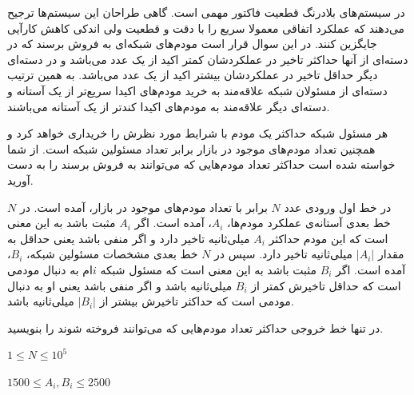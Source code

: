 \documentclass[11.5pt,a4paper,oneside]{article}
\begin{document}
\def\problemCode{Realtime}
\def\problemEnglishTitle{Realtime Network}
\def\problemFarsiTitle{شبکه‌های بلادرنگ}
\def\timeLimit{$1$ \second}
\def\memLimit{$32$ \megabytes}
\begin{problem}
در سیستم‌های بلادرنگ قطعیت فاکتور مهمی است. گاهی طراحان این سیستم‌ها ترجیح می‌دهند که عملکرد اتفاقی معمولا سریع را با دقت و قطعیت ولی اندکی کاهش کارآیی جایگزین کنند. در این سوال قرار است مودم‌های شبکه‌ای به فروش برسند که در دسته‌ای از آنها حداکثر تاخیر در عملکردشان کمتر اکید از یک عدد می‌باشد و در دسته‌ای دیگر حداقل تاخیر در عملکردشان بیشتر اکید از یک عدد می‌باشد. به همین ترتیب دسته‌ای از مسئولان شبکه علاقه‌مند به خرید مودم‌های اکیدا سریع‌تر از یک آستانه و دسته‌ای دیگر علاقه‌مند به مودم‌های اکیدا کند‌تر از یک آستانه می‌باشند.

هر مسئول شبکه حداکثر یک مودم با شرایط مورد نظرش را خریداری خواهد کرد و همچنین تعداد مودم‌های موجود در بازار برابر تعداد مسئولین شبکه است. از شما خواسته شده است حداکثر تعداد مودم‌هایی که می‌توانند به فروش برسند را به‌ دست آورید.

در خط اول ورودی عدد $N$ برابر با تعداد مودم‌های موجود در بازار، آمده است. در $N$ خط بعدی آستانه‌ی عملکرد مودم‌ها، $A_i$، آمده است. اگر $A_i$ مثبت باشد به این معنی است که این مودم حداکثر $A_i$ میلی‌ثانیه تاخیر دارد و اگر منفی باشد یعنی حداقل به مقدار $|A_i|$ میلی‌ثانیه تاخیر دارد.
سپس در $N$ خط بعدی مشخصات مسئولین شبکه، $B_i$، آمده است. اگر $B_i$ مثبت باشد به این معنی است که مسئول شبکه $i$ام به دنبال مودمی است که حداقل تاخیرش کمتر از $B_i$ میلی‌ثانیه باشد و اگر منفی باشد یعنی او به دنبال مودمی است که حداکثر تاخیرش بیشتر از $|B_i|$ میلی‌ثانیه باشد.

\outputDescription
در تنها خط خروجی حداکثر تعداد مودم‌هایی که می‌توانند فروخته شوند را بنویسید.

\constraints
\begin{shortitems}
\item $1 \le N \le 10^5$
\item $1500 \le A_i, B_i \le 2500$
\end{shortitems}

\sampleIO

\begin{example}
%
%
%
\end{example}



\end{problem}
\end{document}
